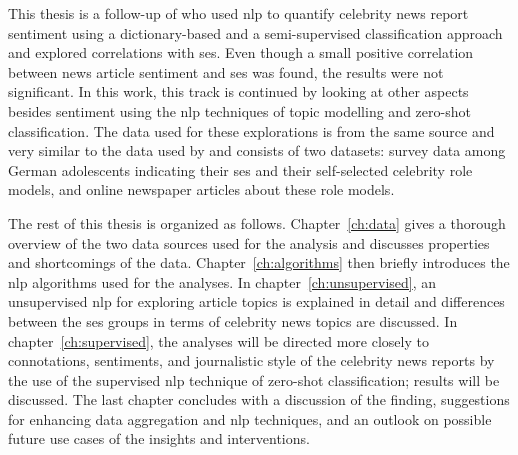 This thesis is a follow-up of \textcite{fenske_using_2022} who used \gls{nlp} to quantify celebrity news report sentiment using a dictionary-based and a semi-supervised classification approach and explored correlations with \gls{ses}. Even though a small positive correlation between news article sentiment and \gls{ses} was found, the results were not significant. In this work, this track is continued by looking at other aspects besides sentiment using the \gls{nlp} techniques of topic modelling and zero-shot classification. The data used for these explorations is from the same source and very similar to the data used by \textcite{fenske_using_2022} and consists of two datasets: survey data among German adolescents indicating their \gls{ses} and their self-selected celebrity role models, and online newspaper articles about these role models.

The rest of this thesis is organized as follows. Chapter~\ref{ch:data} gives a thorough overview of the two data sources used for the analysis and discusses properties and shortcomings of the data. Chapter~\ref{ch:algorithms} then briefly introduces the \gls{nlp} algorithms used for the analyses. In chapter~\ref{ch:unsupervised}, an unsupervised \gls{nlp} for exploring article topics is explained in detail and differences between the \gls{ses} groups in terms of celebrity news topics are discussed. In chapter~\ref{ch:supervised}, the analyses will be directed more closely to connotations, sentiments, and journalistic style of the celebrity news reports by the use of the supervised \gls{nlp} technique of zero-shot classification; results will be discussed. The last chapter concludes with a discussion of the finding, suggestions for enhancing data aggregation and \gls{nlp} techniques, and an outlook on possible future use cases of the insights and interventions.